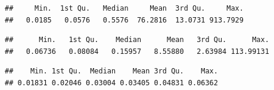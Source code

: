 \documentclass[
]{article}
\newenvironment{Shaded}{\begin{snugshade}}{\end{snugshade}}
\newcommand{\KeywordTok}[1]{\textcolor[rgb]{0.13,0.29,0.53}{\textbf{#1}}}
\newcommand{\NormalTok}[1]{#1}
\newcommand{\OperatorTok}[1]{\textcolor[rgb]{0.81,0.36,0.00}{\textbf{#1}}}
\newcommand{\StringTok}[1]{\textcolor[rgb]{0.31,0.60,0.02}{#1}}
\begin{document}
\begin{Shaded}
\end{Shaded}

\begin{verbatim}
##     Min.  1st Qu.   Median     Mean  3rd Qu.     Max. 
##   0.0185   0.0576   0.5576  76.2816  13.0731 913.7929
\end{verbatim}

\begin{Shaded}
\end{Shaded}

\begin{verbatim}
##      Min.   1st Qu.    Median      Mean   3rd Qu.      Max. 
##   0.06736   0.08084   0.15957   8.55880   2.63984 113.99131
\end{verbatim}

\begin{Shaded}
\end{Shaded}

\begin{verbatim}
##    Min. 1st Qu.  Median    Mean 3rd Qu.    Max. 
## 0.01831 0.02046 0.03004 0.03405 0.04831 0.06362
\end{verbatim}
\end{document}
